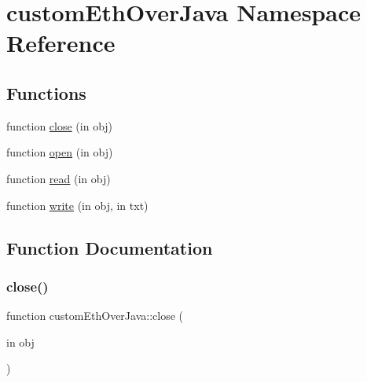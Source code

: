 \hypertarget{namespacecustom_eth_over_java}{}\section{custom\+Eth\+Over\+Java Namespace Reference}
\label{namespacecustom_eth_over_java}
\subsection*{Functions}
\begin{DoxyCompactItemize}
\item 
function \hyperlink{namespacecustom_eth_over_java_a8f09cfe7a4412a6790f5b501fcaf509d}{close} (in obj)
\item 
function \hyperlink{namespacecustom_eth_over_java_a374c1502d0d8c022d2043a190722c94b}{open} (in obj)
\item 
function \hyperlink{namespacecustom_eth_over_java_a9d4463f22089712df0063298e0c8b3ba}{read} (in obj)
\item 
function \hyperlink{namespacecustom_eth_over_java_a3524881518c6d0c72d738179bd656605}{write} (in obj, in txt)
\end{DoxyCompactItemize}


\subsection{Function Documentation}
\mbox{\label{namespacecustom_eth_over_java_a8f09cfe7a4412a6790f5b501fcaf509d}} 
\subsubsection{\texorpdfstring{close()}{close()}}
{\footnotesize\ttfamily function custom\+Eth\+Over\+Java\+::close (\begin{DoxyParamCaption}\item[{in}]{obj }\end{DoxyParamCaption})}

\mbox{\label{namespacecustom_eth_over_java_a374c1502d0d8c022d2043a190722c94b}} 
